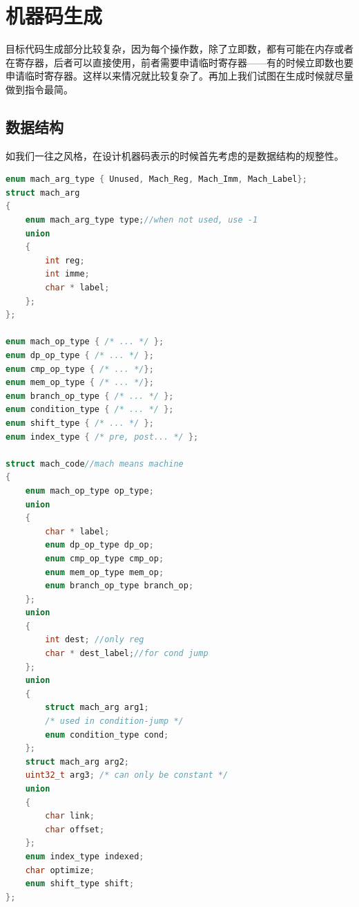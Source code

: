 \documentclass[12pt,a4paper,Flow]{report}
\begin{document}
\section{机器码生成}
目标代码生成部分比较复杂，因为每个操作数，除了立即数，都有可能在内存或者在寄存器，后者可以直接使用，前者需要申请临时寄存器——有的时候立即数也要申请临时寄存器。这样以来情况就比较复杂了。再加上我们试图在生成时候就尽量做到指令最简。
\subsection{数据结构}
如我们一往之风格，在设计机器码表示的时候首先考虑的是数据结构的规整性。
\begin{lstlisting}[language=c]
enum mach_arg_type { Unused, Mach_Reg, Mach_Imm, Mach_Label};
struct mach_arg
{
    enum mach_arg_type type;//when not used, use -1
    union
    {
        int reg;
		int imme;
		char * label;
    };
};

enum mach_op_type { /* ... */ };
enum dp_op_type { /* ... */ };
enum cmp_op_type { /* ... */};
enum mem_op_type { /* ... */};
enum branch_op_type { /* ... */ };
enum condition_type { /* ... */ };
enum shift_type { /* ... */ };
enum index_type { /* pre, post... */ }; 

struct mach_code//mach means machine
{
	enum mach_op_type op_type;
	union
	{
		char * label;
		enum dp_op_type dp_op;
		enum cmp_op_type cmp_op;
		enum mem_op_type mem_op;
		enum branch_op_type branch_op;
	};
	union
	{
		int dest; //only reg
		char * dest_label;//for cond jump
	};
	union
	{
		struct mach_arg arg1;
        /* used in condition-jump */
		enum condition_type cond;
	};		
	struct mach_arg arg2;
	uint32_t arg3; /* can only be constant */
	union
	{
		char link;
		char offset;
	};
	enum index_type indexed;
	char optimize;
	enum shift_type shift;
};
\end{lstlisting}
\end{document}
